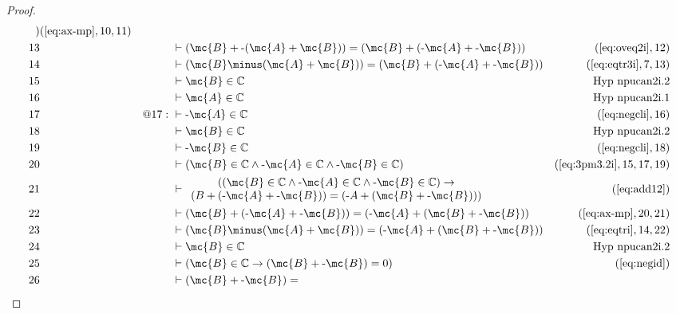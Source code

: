 \begin{proof}
\begin{align}
     )&(\mbox{\ref{eq:ax-mp}},10,11)\notag
  \\ 13 &&  & \vdash ( \mc{B} + \textrm{-} ( \mc{A} + \mc{B} ) ) = ( \mc{B} + ( \textrm{-} \mc{A} +
     \textrm{-} \mc{B} ) )&(\mbox{\ref{eq:oveq2i}},12)\notag
  \\ 14 &&  & \vdash ( \mc{B} \minus ( \mc{A} + \mc{B} ) ) = ( \mc{B} + ( \textrm{-} \mc{A} + \textrm{-}
     \mc{B} ) )&(\mbox{\ref{eq:eqtr3i}},7,13)\notag
  \\ 15 &&  & \vdash \mc{B} \in \mathbb{C}&\text{Hyp~npucan2i.2}\notag%
  \\ 16 &&  & \vdash \mc{A} \in \mathbb{C}&\text{Hyp~npucan2i.1}\notag%
  \\ 17 && @17:\  & \vdash \textrm{-} \mc{A} \in
     \mathbb{C}&(\mbox{\ref{eq:negcli}},16)\notag
  \\ 18 &&  & \vdash \mc{B} \in \mathbb{C}&\text{Hyp~npucan2i.2}\notag%
  \\ 19 &&  & \vdash \textrm{-} \mc{B} \in
     \mathbb{C}&(\mbox{\ref{eq:negcli}},18)\notag
  \\ 20 &&  & \vdash ( \mc{B} \in \mathbb{C} \wedge \textrm{-} \mc{A} \in \mathbb{C}
     \wedge \textrm{-} \mc{B} \in \mathbb{C}
     )&(\mbox{\ref{eq:3pm3.2i}},15,17,19)\notag
  \\ 21 &&  & \vdash 
     \begin{array}{c}
     ( ( \mc{B} \in \mathbb{C} \wedge \textrm{-} \mc{A} \in \mathbb{C}
     \wedge \textrm{-} \mc{B} \in \mathbb{C} ) \rightarrow \\
     ( B
     + ( \textrm{-} \mc{A} + \textrm{-} \mc{B} ) ) = ( \textrm{-} A
     + ( \mc{B} + \textrm{-} \mc{B} ) )
     )
     \end{array}
     &(\mbox{\ref{eq:add12}})\notag
  \\ 22 &&  & \vdash ( \mc{B} + ( \textrm{-} \mc{A} + \textrm{-} \mc{B} ) ) = ( \textrm{-} \mc{A} +
     ( \mc{B} + \textrm{-} \mc{B} )
     )&(\mbox{\ref{eq:ax-mp}},20,21)\notag
  \\ 23 &&  & \vdash ( \mc{B} \minus ( \mc{A} + \mc{B} ) ) = ( \textrm{-} \mc{A} + ( \mc{B} + \textrm{-}
     \mc{B} ) )&(\mbox{\ref{eq:eqtri}},14,22)\notag
  \\ 24 &&  & \vdash \mc{B} \in \mathbb{C}&\text{Hyp~npucan2i.2}\notag%
  \\ 25 &&  & \vdash ( \mc{B} \in \mathbb{C} \rightarrow ( \mc{B} + \textrm{-} \mc{B} ) = 0
     )&(\mbox{\ref{eq:negid}})\notag
  \\ 26 &&  & \vdash ( \mc{B} + \textrm{-} \mc{B} ) =

\end{align}
\end{proof}
